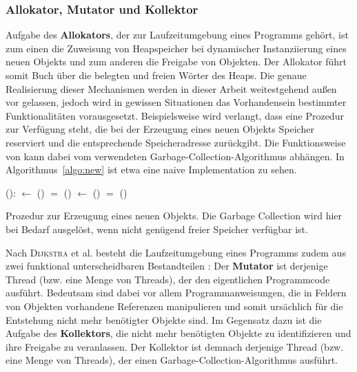 \subsubsection*{Allokator, Mutator und Kollektor}
Aufgabe des \textbf{Allokators}, der zur Laufzeitumgebung eines Programms gehört, ist zum einen die Zuweisung von Heapspeicher bei dynamischer Instanziierung eines neuen Objekts und zum anderen die Freigabe von Objekten.
Der Allokator führt somit Buch über die belegten und freien Wörter des Heaps.
Die genaue Realisierung dieser Mechanismen werden in dieser Arbeit weitestgehend außen vor gelassen, jedoch wird in gewissen Situationen das Vorhandensein bestimmter Funktionalitäten vorausgesetzt.
Beispielsweise wird verlangt, dass eine Prozedur  zur Verfügung steht, die bei der Erzeugung eines neuen Objekts Speicher reserviert und die entsprechende Speicheradresse zurückgibt.
Die Funktionsweise von  kann dabei vom verwendeten Garbage-Collection-Algorithmus abhängen.
In Algorithmus~\ref{algo:new} ist etwa eine naive Implementation zu sehen.

\begin{algorithm}
\begin{algorithmic}[1]
	\State {}():
	\State \quad {} $\gets$ ()		
	\State \quad \IF {} $=$ \Null		{}
	\State \quad \quad {}()	
	\State \quad \quad {} $\gets$ ()	
	\State \quad \quad \IF {} $=$ \Null
	\State \quad \quad \quad {}()
	\State \quad \Return {}
\end{algorithmic}
\caption[Prozedur  zur Erzeugung eines neuen Objekts]{Prozedur  zur Erzeugung eines neuen Objekts. Die Garbage Collection wird hier bei Bedarf ausgelöst, wenn nicht genügend freier Speicher verfügbar ist.}
\label{algo:new}
\end{algorithm}

Nach \textsc{Dijkstra} et al. besteht die Laufzeitumgebung eines Programms zudem aus zwei funktional unterscheidbaren Bestandteilen \cite[S. 967]{dijkstra1978}:
Der \textbf{Mutator} ist derjenige Thread (bzw. eine Menge von Threads), der den eigentlichen Programmcode ausführt.
Bedeutsam sind dabei vor allem Programmanweisungen, die in Feldern von Objekten vorhandene Referenzen manipulieren und somit ursächlich für die Entstehung nicht mehr benötigter Objekte sind.
Im Gegensatz dazu ist die Aufgabe des \textbf{Kollektors}, die nicht mehr benötigten Objekte zu identifizieren und ihre Freigabe zu veranlassen.
Der Kollektor ist demnach derjenige Thread (bzw. eine Menge von Threads), der einen Garbage-Collection-Algorithmus ausführt.


